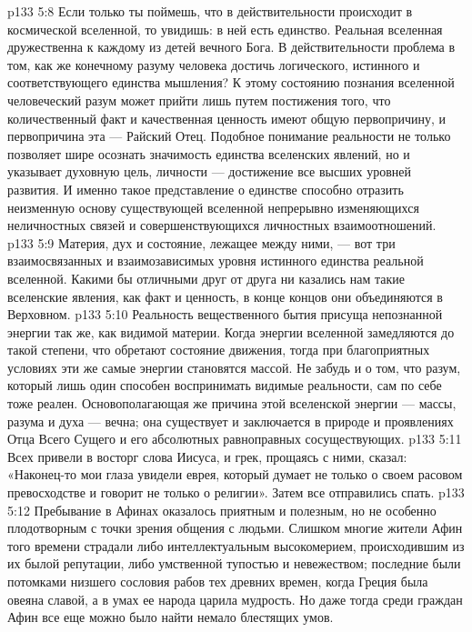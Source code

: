 \vs p133 5:8 Если только ты поймешь, что в действительности происходит в космической вселенной, то увидишь: в ней есть единство. Реальная вселенная дружественна к каждому из детей вечного Бога. В действительности проблема в том, как же конечному разуму человека достичь логического, истинного и соответствующего единства мышления? К этому состоянию познания вселенной человеческий разум может прийти лишь путем постижения того, что количественный факт и качественная ценность имеют общую первопричину, и первопричина эта --- Райский Отец. Подобное понимание реальности не только позволяет шире осознать значимость единства вселенских явлений, но и указывает духовную цель, личности --- достижение все высших уровней развития. И именно такое представление о единстве способно отразить неизменную основу существующей вселенной непрерывно изменяющихся неличностных связей и совершенствующихся личностных взаимоотношений.
\vs p133 5:9 Материя, дух и состояние, лежащее между ними, --- вот три взаимосвязанных и взаимозависимых уровня истинного единства реальной вселенной. Какими бы отличными друг от друга ни казались нам такие вселенские явления, как факт и ценность, в конце концов они объединяются в Верховном.
\vs p133 5:10 Реальность вещественного бытия присуща непознанной энергии так же, как видимой материи. Когда энергии вселенной замедляются до такой степени, что обретают состояние движения, тогда при благоприятных условиях эти же самые энергии становятся массой. Не забудь и о том, что разум, который лишь один способен воспринимать видимые реальности, сам по себе тоже реален. Основополагающая же причина этой вселенской энергии --- массы, разума и духа --- вечна; она существует и заключается в природе и проявлениях Отца Всего Сущего и его абсолютных равноправных сосуществующих.
\vs p133 5:11 \pc Всех привели в восторг слова Иисуса, и грек, прощаясь с ними, сказал: «Наконец\hyp{}то мои глаза увидели еврея, который думает не только о своем расовом превосходстве и говорит не только о религии». Затем все отправились спать.
\vs p133 5:12 Пребывание в Афинах оказалось приятным и полезным, но не особенно плодотворным с точки зрения общения с людьми. Слишком многие жители Афин того времени страдали либо интеллектуальным высокомерием, происходившим из их былой репутации, либо умственной тупостью и невежеством; последние были потомками низшего сословия рабов тех древних времен, когда Греция была овеяна славой, а в умах ее народа царила мудрость. Но даже тогда среди граждан Афин все еще можно было найти немало блестящих умов.
